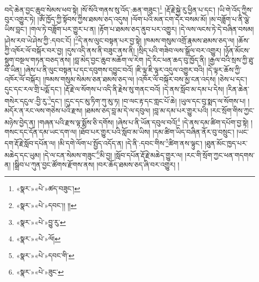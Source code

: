 བདེ་ཆེན་བྱང་ཆུབ་སེམས་ཕབ་སྟེ། །སོ་སོའི་གནས་སུ་འོད་:ཆན་གཟུང་།\footnote{«སྣར་»«པེ་»ཚད་བཟུང་།} །རྡོ་རྗེ་སྐྱེ་རུ་ཕྱིན་པ་དང་། །ཡི་གེ་འོད་ཀྱིས་བུར་འགྱུར་ཏེ། །ཨོཾ་ཁྱོད་ཀྱི་སྟོབས་ཀྱིས་ཐམས་ཅད་འདུས། །ལོག་པའི་མན་ངག་དེར་བསམ་མོ། །མ་བཟློག་པ་ནི་ལྕེ་ཡིས་བླང་། །གལ་ཏེ་བཟློག་པར་གྱུར་པ་ན། །རྟོག་པ་ཐམས་ཅད་ནུབ་པར་འགྱུར། །དེ་ལས་ལངས་ཏེ་དེ་བཞིན་བསམ། །ཤེས་རབ་ཡེ་ཤེས་ཀྱི་:དབང་ངོ། །\footnote{«སྣར་»«པེ་»དབང་།། །།}དེ་ནས་ལུང་བསྟན་པར་བྱ་སྟེ། །ཁམས་གསུམ་འགྲོ་རྣམས་ཐམས་ཅད་ལ། །ཆོས་ཀྱི་འཁོར་ལོ་བསྐོར་བར་བྱ། །དུས་འདི་ནས་ནི་བཟུང་ནས་ནི། །སྲིད་པའི་གཟེབ་ལས་སྒྲོལ་བར་འགྱུར། །ཉོན་མོངས་སྡུག་བསྔལ་གཏན་བཅད་ནས། །བླ་མེད་བྱང་ཆུབ་མཆོག་ལ་རེག །དེ་རིང་ཕན་ཆད་བུ་ཁྱོད་ནི། །རྒྱལ་བའི་སྲས་ཀྱི་ཐུ་བོ་ཡིན། །ཞེས་པ་ནི་ལུང་བསྟན་པ་དང་དབུགས་དབྱུང་བའོ། །ཇི་ལྟ་ཇི་ལྟར་འདུལ་འགྱུར་བའི། །དེ་ལྟར་ཆོས་ཀྱི་འཁོར་ལོ་བསྐོར། །ཁམས་གསུམ་སེམས་ཅན་ཐམས་ཅད་ལ། །འཁོར་ལོ་བསྐོར་བས་མྱ་ངན་འདས། །ཅེས་པ་དང་། དུང་དང་རལ་གྲི་པདྨོ་དང་། །རྡོ་རྗེ་ལ་སོགས་པ་འདི་ནི་རྗེས་སུ་གནང་བའོ། །དེ་ནས་སློབ་མ་དམ་པ་དེས། །རིན་ཆེན་གསེར་དངུལ་:བྱི་རུ་\footnote{«སྣར་»«པེ་»བྱུ་རུ་}དང་། །དུང་དང་མུ་ཏིག་ཀུ་མུ་ཏ། །བ་ལང་རྟ་དང་གླང་པོ་ཆེ། །ཡུལ་དང་བུ་སྨད་ལ་སོགས་པ། །མདོར་ན་རང་ལས་གཅེས་པའི་རྫས། །ཐམས་ཅད་བླ་མ་དེ་ལ་དབུལ། །བླ་མ་དམ་པར་གྱུར་པའི། །རང་སྲོག་གིས་ཀྱང་མཉེས་བྱེད་ན། །གཞན་པའི་རྫས་ལྟ་སྨོས་ཅི་དགོས། །ཞེས་པ་ནི་ཡོན་དབུལ་བའོ།\footnote{«སྣར་»«པེ་»ལོ།} །དེ་ནས་དམ་ཚིག་དཔོག་བྱ་སྟེ། །གསང་དང་དོན་དམ་ཡང་དག་ལ། །ཐོབ་པར་གྱུར་པའི་སློབ་མ་ཡིས། །དམ་ཚིག་ཡིད་བཞིན་ནོར་བུ་བསྲུང་། །ཡང་དག་རྡོ་རྗེ་སློབ་དཔོན་ལ། །མི་དགེ་ལོག་པ་སྤྱོད་འདོད་ན། །དེ་ནི་:དབང་གིས་\footnote{«སྣར་»«པེ་»དབང་གི་}ཚིག་ནས་ལྟུང་། །ཐུན་མོང་ཁྱད་པར་མཆེད་དང་ཡུམ། །དེ་ལ་ངན་སེམས་གཟུང་\footnote{«སྣར་»«པེ་»ཟུང་}མི་བྱ། །སློབ་དཔོན་རྡོ་རྗེ་མཆེད་གྱུར་ལ། །རང་གི་སྲོག་ཀྱང་ཕན་གདགས་ན། །སྒྲིབ་པ་ཀུན་བྱང་ཚོགས་རྫོགས་ནས། །བར་ཆོད་ཐམས་ཅད་ཞི་བར་འགྱུར། །
